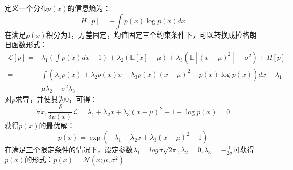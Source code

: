 定义一个分布$p(x)$的信息熵为：
\begin{equation}
    H[p]=-\int p(x)\log p(x)dx
\end{equation}
在满足$p(x)$积分为1，方差固定，均值固定三个约束条件下，可以转换成拉格朗日函数形式：
\begin{equation}
    \begin{aligned}
    \mathcal{L}[p]=&\lambda_1(\int p(x)dx-1)+\lambda_2(\mathbb{E}[x]-\mu)+\lambda_3(\mathbb{E}[(x-\mu)^2]-\sigma^2)+H[p]\\
    =&\int(\lambda_1p(x)+\lambda_2p(x)x+\lambda_3p(x)(x-\mu)^2-p(x)\log p(x))dx-\lambda_1-\\
    &\mu\lambda_2-\sigma^2\lambda_3
    \end{aligned}
\end{equation}
对$p$求导，并使其为0，可得：
\begin{equation}
    \forall x,\frac{\delta}{\delta p(x)}\mathcal{L}=\lambda_1+\lambda_2x+\lambda_3(x-\mu)^2-1-\log p(x)=0
\end{equation}
获得$p(x)$的最优解：
\begin{equation}
    p(x)=\exp (-\lambda_1-\lambda_2x+\lambda_3(x-\mu)^2+1)
\end{equation}
在满足三个限定条件的情况下，设定参数$\lambda_1=log \sigma\sqrt{2\pi}, \lambda_2=0, \lambda_3=-\frac{1}{2\sigma}$可获得$p(x)$的形式：$p(x)=\mathcal{N}(x;\mu,\sigma^2)$


